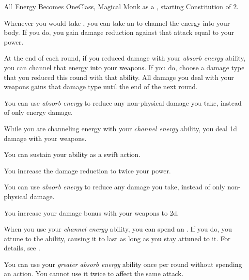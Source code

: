     \begin{feat}{All Energy Becomes One}{Class, Magical}
        \featpre Monk as a , starting Constitution of 2.

         Whenever you would take , you can take an  to channel the energy into your body.
        If you do, you gain damage reduction against that attack equal to your \ki power.

         At the end of each round, if you reduced damage with your \textit{absorb energy} ability, you can channel that energy into your weapons.
        If you do, choose a damage type that you reduced this round with that ability.
        All damage you deal with your weapons gains that damage type until the end of the next round.

         You can use \textit{absorb energy} to reduce any non-physical damage you take, instead of only energy damage.

         While you are channeling energy with your \textit{channel energy} ability, you deal \plus1d damage with your weapons.

         You can sustain your  ability as a swift action.

         You increase the damage reduction to twice your \ki power.

         You can use \textit{absorb energy} to reduce any damage you take, instead of only non-physical damage.

         You increase your damage bonus with your weapons to \plus2d.

         When you use your \textit{channel energy} ability, you can spend an .
        If you do, you attune to the ability, causing it to last as long as you stay attuned to it.
        For details, see .

         You can use your \textit{greater absorb energy} ability once per round without spending an action.
        You cannot use it twice to affect the same attack.
    \end{feat}

